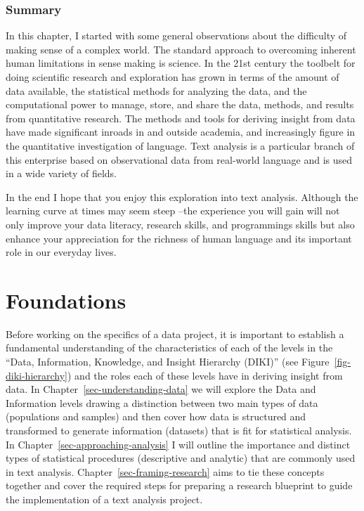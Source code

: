 \documentclass[
  letterpaper,
  DIV=11,
  numbers=noendperiod]{scrreprt}
\theoremstyle{definition}
\theoremstyle{remark}
\begin{document}
\section*{Summary}\label{summary}


In this chapter, I started with some general observations about the
difficulty of making sense of a complex world. The standard approach to
overcoming inherent human limitations in sense making is science. In the
21st century the toolbelt for doing scientific research and exploration
has grown in terms of the amount of data available, the statistical
methods for analyzing the data, and the computational power to manage,
store, and share the data, methods, and results from quantitative
research. The methods and tools for deriving insight from data have made
significant inroads in and outside academia, and increasingly figure in
the quantitative investigation of language. Text analysis is a
particular branch of this enterprise based on observational data from
real-world language and is used in a wide variety of fields.

In the end I hope that you enjoy this exploration into text analysis.
Although the learning curve at times may seem steep --the experience you
will gain will not only improve your data literacy, research skills, and
programmings skills but also enhance your appreciation for the richness
of human language and its important role in our everyday lives.

\part{Foundations}

Before working on the specifics of a data project, it is important to
establish a fundamental understanding of the characteristics of each of
the levels in the ``Data, Information, Knowledge, and Insight Hierarchy
(DIKI)'' (see Figure~\ref{fig-diki-hierarchy}) and the roles each of
these levels have in deriving insight from data. In
Chapter~\ref{sec-understanding-data} we will explore the Data and
Information levels drawing a distinction between two main types of data
(populations and samples) and then cover how data is structured and
transformed to generate information (datasets) that is fit for
statistical analysis. In Chapter~\ref{sec-approaching-analysis} I will
outline the importance and distinct types of statistical procedures
(descriptive and analytic) that are commonly used in text analysis.
Chapter~\ref{sec-framing-research} aims to tie these concepts together
and cover the required steps for preparing a research blueprint to guide
the implementation of a text analysis project.
\end{document}
